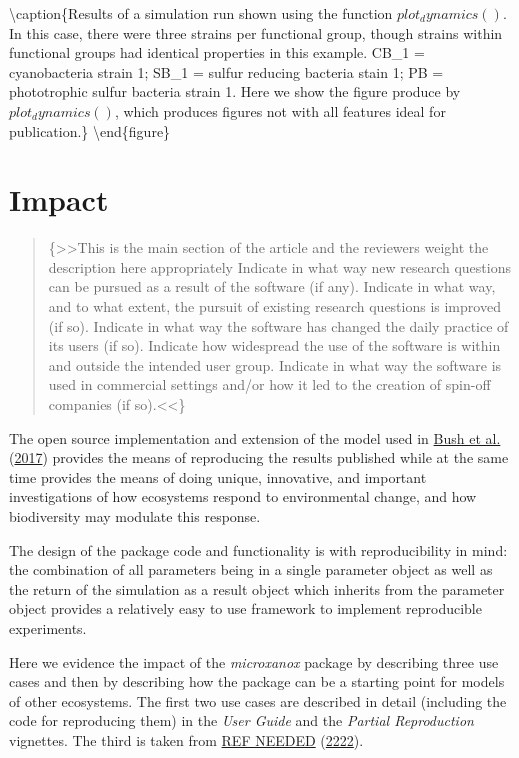 \documentclass[]{elsarticle} %
\begin{document}
\textbackslash caption\{Results of a simulation run shown using the
function \(plot_dynamics()\). In this case, there were three strains per
functional group, though strains within functional groups had identical
properties in this example. CB\_1 = cyanobacteria strain 1; SB\_1 =
sulfur reducing bacteria stain 1; PB = phototrophic sulfur bacteria
strain 1. Here we show the figure produce by \(plot_dynamics()\), which
produces figures not with all features ideal for
publication.\}\label{fig:plot-dynamics} \textbackslash end\{figure\}

\hypertarget{impact}{%
\section{Impact}\label{impact}}

\begin{quote}
\{\textgreater\textgreater This is the main section of the article and
the reviewers weight the description here appropriately Indicate in what
way new research questions can be pursued as a result of the software
(if any). Indicate in what way, and to what extent, the pursuit of
existing research questions is improved (if so). Indicate in what way
the software has changed the daily practice of its users (if so).
Indicate how widespread the use of the software is within and outside
the intended user group. Indicate in what way the software is used in
commercial settings and/or how it led to the creation of spin-off
companies (if so).\textless\textless\}
\end{quote}

The open source implementation and extension of the model used in
\protect\hyperlink{ref-Bush2017}{Bush et al.}
(\protect\hyperlink{ref-Bush2017}{2017}) provides the means of
reproducing the results published while at the same time provides the
means of doing unique, innovative, and important investigations of how
ecosystems respond to environmental change, and how biodiversity may
modulate this response.

The design of the package code and functionality is with reproducibility
in mind: the combination of all parameters being in a single parameter
object as well as the return of the simulation as a result object which
inherits from the parameter object provides a relatively easy to use
framework to implement reproducible experiments.

Here we evidence the impact of the \emph{microxanox} package by
describing three use cases and then by describing how the package can be
a starting point for models of other ecosystems. The first two use cases
are described in detail (including the code for reproducing them) in the
\emph{User Guide} and the \emph{Partial Reproduction} vignettes. The
third is taken from \protect\hyperlink{ref-REF_NEEDED}{REF NEEDED}
(\protect\hyperlink{ref-REF_NEEDED}{2222}).
\end{document}
